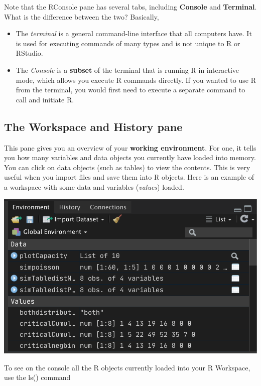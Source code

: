 \documentclass[]{book}
\begin{document}
Note that the RConsole pane has several tabs, including \textbf{Console} and \textbf{Terminal}. What is the difference between the two? Basically,

\begin{itemize}
\item
  The \emph{terminal} is a general command-line interface that all computers have. It is used for executing commands of many types and is not unique to R or RStudio.
\item
  The \emph{Console} is a \textbf{subset} of the terminal that is running R in interactive mode, which allows you execute R commands directly. If you wanted to use R from the terminal, you would first need to execute a separate command to call and initiate R.
\end{itemize}

\hypertarget{the-workspace-and-history-pane}{%
\subsection{The Workspace and History pane}\label{the-workspace-and-history-pane}}

This pane gives you an overview of your \textbf{working environment}. For one, it tells you how many variables and data objects you currently have loaded into memory. You can click on data objects (such as tables) to view the contents. This is very useful when you import files and save them into R objects. Here is an example of a workspace with some data and variables (\emph{values}) loaded.

\includegraphics{images/workspace.png}

To see on the console all the R objects currently loaded into your R Workspace, use the ls() command
\end{document}
